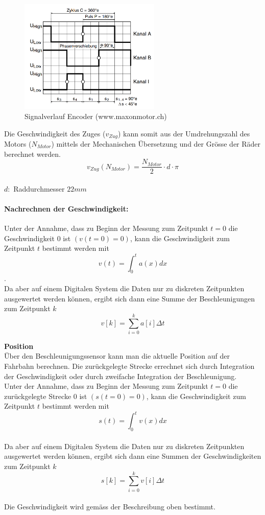 \documentclass[../../main.tex]{subfiles}
\begin{document}
    \begin{figure}[H]
        \centering
        \includegraphics[width=0.6\textwidth]{Encoder_MR.png}
        \caption {Signalverlauf Encoder (www.maxonmotor.ch)}
        \label{fig:et_encoder}
    \end{figure}

    Die Geschwindigkeit des Zuges ($v_{Zug}$) kann somit aus der Umdrehungszahl des Motors ($N_{Motor}$) mittels der Mechanischen Übersetzung und der Grösse der Räder berechnet werden.
    $$v_{Zug}(N_{Motor}) = \frac{N_{Motor}}{2} \cdot d \cdot \pi$$\\
    $d:$ Raddurchmesser $22mm$\\

    \paragraph{Nachrechnen der Geschwindigkeit:}
    Unter der Annahme, dass zu Beginn der Messung zum Zeitpunkt $t = 0$ die Geschwindigkeit $0$ ist $(v(t=0) = 0)$, kann die Geschwindigkeit zum Zeitpunkt $t$ bestimmt werden mit $$v(t) = \int_{0}^{t} a(x) dx$$.\\
    Da aber auf einem Digitalen System die Daten nur zu diskreten Zeitpunkten ausgewertet werden können, ergibt sich dann eine Summe der Beschleunigungen zum Zeitpunkt $k$ $$v[k] = \sum_{i=0}^{k}a[i] \Delta t$$

    \textbf{Position}\\
    Über den Beschleunigungssensor kann man die aktuelle Position auf der Fahrbahn berechnen. Die zurückgelegte Strecke errechnet sich durch Integration der Geschwindigkeit oder durch zweifache Integration der Beschleunigung.\\
    Unter der Annahme, dass zu Beginn der Messung zum Zeitpunkt $t = 0$ die zurückgelegte Strecke $0$ ist $(s(t=0) = 0)$, kann die Geschwindigkeit zum Zeitpunkt $t$ bestimmt werden mit $$s(t) = \int_{0}^{t} v(x) dx$$\\
    Da aber auf einem Digitalen System die Daten nur zu diskreten Zeitpunkten ausgewertet werden können, ergibt sich dann eine Summen der Geschwindigkeiten zum Zeitpunkt $k$ $$s[k] = \sum_{i=0}^{k}v[i] \Delta t$$\\
    Die Geschwindigkeit wird gemäss der Beschreibung oben bestimmt.
\end{document}
